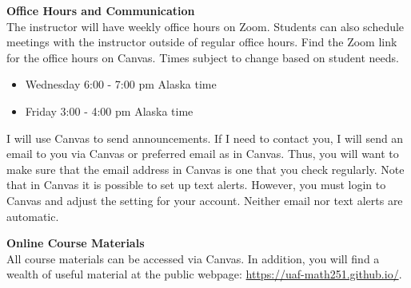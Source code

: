\documentclass[12pt]{article}
\renewcommand{\emph}[1]{\textsf{\textbf{#1}}}
\newcommand{\localhead}[1]{\par\smallskip\textbf{#1}\nobreak\\}%
\def\heading#1{\localhead{\large\emph{#1}}}
\begin{document}
\heading{Office Hours and Communication}
The instructor will have weekly office hours on Zoom. Students can also schedule meetings with the instructor outside of regular office hours. Find the Zoom link for the office hours on Canvas. Times subject to change based on student needs. 
\begin{itemize}
\itemsep0em
\item Wednesday 6:00 - 7:00 pm Alaska time
\item Friday 3:00 - 4:00 pm Alaska time
\end{itemize}

I will use Canvas to send announcements. If I need to contact you, I will send an email to you via Canvas or preferred email as in Canvas. Thus, you will want to make sure that the email address in Canvas is one that you check regularly. Note that in Canvas it is possible to set up text alerts. However, you must login to Canvas and adjust the setting for your account. Neither email nor text alerts are automatic.

\heading{Online Course Materials}
All course materials can be accessed via Canvas. In addition, you will find a wealth of useful material at the public webpage: \href{https://uaf-math251.github.io/}{https://uaf-math251.github.io/}.

\end{document}
